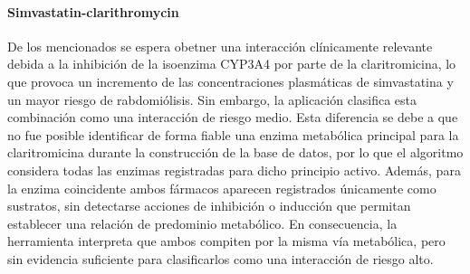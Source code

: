 \paragraph{Simvastatin-clarithromycin} De los mencionados se espera obetner una interacción clínicamente relevante debida a la inhibición de la isoenzima CYP3A4 por parte de la claritromicina, lo que provoca un incremento de las concentraciones plasmáticas de simvastatina y un mayor riesgo de rabdomiólisis. Sin embargo, la aplicación clasifica esta combinación como una interacción de riesgo medio. Esta diferencia se debe a que no fue posible identificar de forma fiable una enzima metabólica principal para la claritromicina durante la construcción de la base de datos, por lo que el algoritmo considera todas las enzimas registradas para dicho principio activo. Además, para la enzima coincidente ambos fármacos aparecen registrados únicamente como sustratos, sin detectarse acciones de inhibición o inducción que permitan establecer una relación de predominio metabólico. En consecuencia, la herramienta interpreta que ambos compiten por la misma vía metabólica, pero sin evidencia suficiente para clasificarlos como una interacción de riesgo alto.
